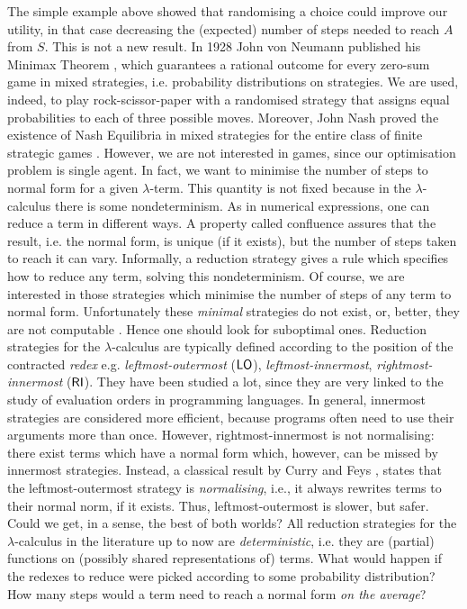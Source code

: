 The simple example above showed that randomising a choice could improve our utility, in that case decreasing the (expected) number of steps needed to reach $A$ from $S$. This is not a new result. In 1928 John von Neumann published his Minimax Theorem \cite{von_neumann_zur_1928}, which guarantees a rational outcome for every zero-sum game in mixed strategies, i.e. probability distributions on strategies. We are used, indeed, to play rock-scissor-paper with a randomised strategy that assigns equal probabilities to each of three possible moves. Moreover, John Nash proved the existence of Nash Equilibria in mixed strategies for the entire class of finite strategic games \cite{nash_equilibrium_1950}. However, we are not interested in games, since our optimisation problem is single agent. In fact, we want to minimise the number of steps to normal form for a given $\lambda$-term. This quantity is not fixed because in the $\lambda$-calculus there is some nondeterminism. As in numerical expressions, one can reduce a term in different ways. A property called confluence assures that the result, i.e. the normal form, is unique (if it exists), but the number of steps taken to reach it can vary. Informally, a reduction strategy gives a rule which specifies how to reduce any term, solving this nondeterminism. Of course, we are interested in those strategies which minimise the number of steps of any term to normal form. Unfortunately these \emph{minimal} strategies do not exist, or, better, they are not computable \cite{barendregt_lambda_1984}. Hence one should look for suboptimal ones. Reduction strategies for
the $\lambda$-calculus are typically defined according to the position
of the contracted \emph{redex} e.g. \emph{leftmost-outermost} ($\textsf{LO}$),
\emph{leftmost-innermost}, \emph{rightmost-innermost} ($\textsf{RI}$). They have been studied a lot, since they are very linked to the study of evaluation orders in programming languages.
In general, innermost strategies are considered more efficient, because
programs often need to use their arguments more than once. However, rightmost-innermost is not normalising: there
exist terms which have a normal form which, however, can be missed by
innermost strategies. Instead, a classical result by Curry and Feys
\cite{curry_combinatory_1958}, states that the leftmost-outermost strategy is
\emph{normalising}, i.e., it always rewrites terms to their normal
norm, if it exists. Thus, leftmost-outermost is slower, but
safer. Could we get, in a sense, the best of both worlds?  All
reduction strategies for the $\lambda$-calculus in the literature up
to now are \emph{deterministic}, i.e. they are (partial) functions on
(possibly shared representations of) terms. What would
happen if the redexes to reduce were picked according to some
probability distribution? How many steps would a term need to reach a
normal form \emph{on the average}?
